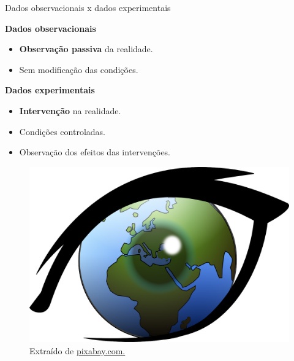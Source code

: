 \documentclass[
  ignorenonframetext,
  serif,
  professionalfont,
  usenames,
  dvipsnames,
  aspectratio = 169]{beamer}
\providecommand{\tightlist}{%
  \setlength{\itemsep}{0pt}\setlength{\parskip}{0pt}}
\renewcommand{\tightlist}{%
  \setlength{\itemsep}{0\baselineskip}
  \setlength{\parskip}{0.25\baselineskip}
}
\def\beginAHalfColumn{\begin{minipage}{0.49\textwidth}}%
\def\endColumns{\end{minipage}}%
\begin{document}
\begin{frame}{Dados observacionais x dados experimentais}
\protect\hypertarget{dados-observacionais-x-dados-experimentais}{}
\beginAHalfColumn

\textbf{Dados observacionais}

\begin{itemize}
\tightlist
\item
  \textbf{Observação passiva} da realidade.
\item
  Sem modificação das condições.
\end{itemize}

\textbf{Dados experimentais}

\begin{itemize}
\tightlist
\item
  \textbf{Intervenção} na realidade.
\item
  Condições controladas.
\item
  Observação dos efeitos das intervenções.
\end{itemize}

\endColumns
\beginAHalfColumn

\begin{figure}

{\centering \includegraphics[width=0.9\linewidth]{./img/observar} 

}

\caption{Extraído de \href{https://cdn.pixabay.com/photo/2013/07/12/15/08/earth-149499_1280.png}{pixabay.com.}}\label{fig:unnamed-chunk-7}
\end{figure}

\endColumns
\end{frame}
\end{document}
